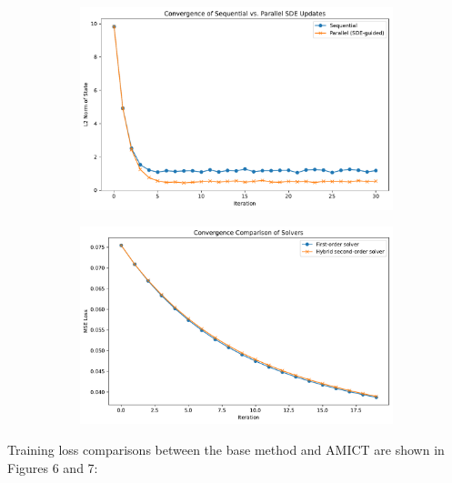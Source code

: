 \documentclass{article} %
\begin{document}
\begin{figure}[H]
  \centering
  \begin{subfigure}[H]{0.48\linewidth}
    \centering
    \includegraphics[width=\linewidth]{ images/convergence_sequential_parallel_pair1.pdf }
  \end{subfigure}
  \begin{subfigure}[H]{0.48\linewidth}
    \centering
    \includegraphics[width=\linewidth]{ images/convergence_solver_pair1.pdf }
  \end{subfigure}
\end{figure}

Training loss comparisons between the base method and AMICT are shown in Figures 6 and 7:
\end{document}
